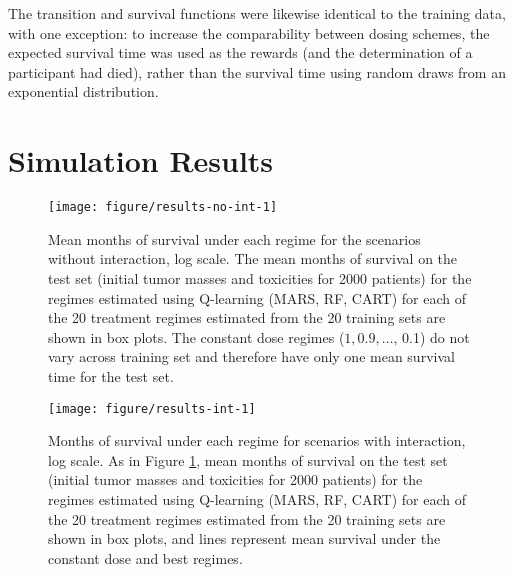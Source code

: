 \documentclass[12pt]{article}
\begin{document}
The transition and survival functions were likewise identical to the training data, with one exception: to increase the comparability between dosing schemes, the expected survival time was used as the rewards (and the determination of a participant had died), rather than the survival time using random draws from an exponential distribution.



\section{Simulation Results} %
\label{sec:simulation_results}

\begin{figure}[!htbp]

{\centering \texttt{[image: figure/results-no-int-1]}}

\caption[Mean months of survival under each regime for the scenarios without interaction]{Mean months of survival under each regime for the scenarios without interaction, log scale. The mean months of survival on the test set (initial tumor masses and toxicities for 2000 patients) for the regimes estimated using Q-learning (MARS, RF, CART) for each of the 20 treatment regimes estimated from the 20 training sets are shown in box plots. The constant dose regimes ($1, 0.9, \ldots$, 0.1) do not vary across training set and therefore have only one mean survival time for the test set.}\label{fig:results-no-int}
\end{figure}

\begin{figure}[!htbp]

{\centering \texttt{[image: figure/results-int-1]}}

\caption[Months of survival under each regime for scenarios with interaction]{Months of survival under each regime for scenarios with interaction, log scale. As in Figure \ref{fig:results-no-int}, mean months of survival on the test set (initial tumor masses and toxicities for 2000 patients) for the regimes estimated using Q-learning (MARS, RF, CART) for each of the 20 treatment regimes estimated from the 20 training sets are shown in box plots, and lines represent mean survival under the constant dose and best regimes.}\label{fig:results-int}
\end{figure}
\end{document}
